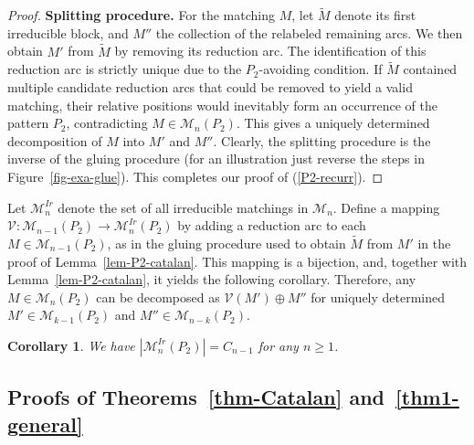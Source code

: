 \documentclass[11pt]{article}
\newtheorem{coro}[thm]{Corollary}
\newcommand{\M}{\mathcal{M}}
\newcommand{\V}{\mathcal{V}}
\begin{document}
\begin{proof}
		\textbf{Splitting procedure.} 
		For the matching \( M \), let \( \widetilde{M} \) denote its first irreducible block, and \( M'' \) the collection of the relabeled remaining arcs. We then obtain \( M' \) from \( \widetilde{M} \) by removing its reduction arc. The identification of this reduction arc is strictly unique due to the $P_2$-avoiding condition. If $\widetilde{M}$ contained multiple candidate reduction arcs that could be removed to yield a valid matching, their relative positions would inevitably form an occurrence of the pattern $P_2$, contradicting $M \in \M_n(P_2)$. This gives a uniquely determined decomposition of \( M \) into \( M' \) and \( M'' \).
		Clearly, the splitting procedure is the inverse of the gluing procedure (for an illustration just reverse the steps in Figure~\ref{fig-exa-glue}). This completes our proof of (\ref{P2-recurr}).\end{proof} 
	
	Let $\M^{Ir}_n$ denote the set of all irreducible matchings in $\mathcal{M}_n$.  
	Define a mapping $\mathcal{V}: \mathcal{M}_{n-1}(P_2) \to \M^{Ir}_n(P_2)$ by adding a reduction arc to each $M \in \mathcal{M}_{n-1}(P_2)$, as in the gluing procedure used to obtain $\widetilde{M}$ from $M'$ in the proof of Lemma~\ref{lem-P2-catalan}.  
	This mapping is a bijection, and, together with Lemma~\ref{lem-P2-catalan}, it yields the following corollary. Therefore, any $M\in\M_n(P_2)$ can be decomposed as $\V(M')\oplus M''$ for uniquely determined $M'\in\M_{k-1}(P_2)$ and $M'' \in \M_{n-k}(P_2)$.
	
	\begin{coro}
		\label{coro-P2-irre}
		We have $|\M^{Ir}_n(P_2)|=C_{n-1}$ for any $n\geq 1$.
	\end{coro}
	
	\subsection{Proofs of Theorems~\ref{thm-Catalan} and~\ref{thm1-general}}\label{sub-genete}
	
\end{document}
